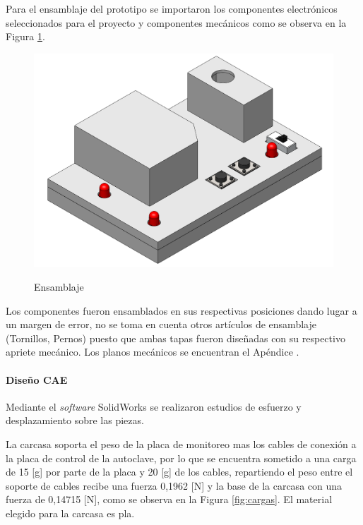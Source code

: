 Para el ensamblaje del prototipo se importaron los componentes electrónicos seleccionados para el proyecto y componentes mecánicos como se observa en la Figura \ref{fig:ensam}.
\begin{figure}[!htb]
    \centering
    \caption{Ensamblaje} %
    {\includegraphics[width=0.8\columnwidth]{Figuras/ensam.png}}\\
    \label{fig:ensam}
\end{figure}
\newpage
Los componentes fueron ensamblados en sus respectivas posiciones dando lugar a un margen de error, no se toma en cuenta otros artículos de ensamblaje (Tornillos, Pernos) puesto que ambas tapas fueron diseñadas con su respectivo apriete mecánico. Los planos mecánicos se encuentran el Apéndice .

\paragraph{Diseño CAE}
Mediante el \textit{software} SolidWorks se realizaron estudios de esfuerzo y desplazamiento sobre las piezas.

La carcasa soporta el peso de la placa de monitoreo mas los cables de conexión a la placa de control de la autoclave, por lo que se encuentra sometido a una carga de 15 [g] por parte de la placa y 20 [g] de los cables, repartiendo el peso entre el soporte de cables recibe una fuerza 0,1962 [N] y la base de la carcasa con una fuerza de 0,14715 [N], como se observa en la Figura \ref{fig:cargas}. El material elegido para la carcasa es \acrfull{pla}.

